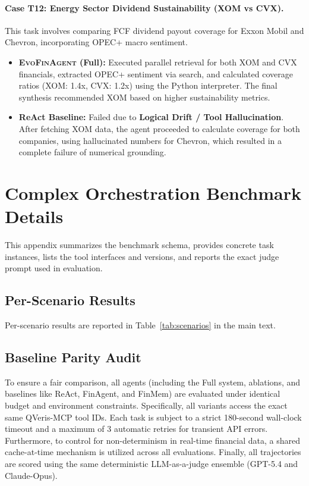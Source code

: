 \documentclass{article}
\begin{document}
\paragraph{Case T12: Energy Sector Dividend Sustainability (XOM vs CVX).}
This task involves comparing FCF dividend payout coverage for Exxon Mobil and Chevron, incorporating OPEC+ macro sentiment.
\begin{itemize}
    \item \textbf{\textsc{EvoFinAgent} (Full):} Executed parallel retrieval for both XOM and CVX financials, extracted OPEC+ sentiment via search, and calculated coverage ratios (XOM: 1.4x, CVX: 1.2x) using the Python interpreter. The final synthesis recommended XOM based on higher sustainability metrics.
    \item \textbf{ReAct Baseline:} Failed due to \textbf{Logical Drift / Tool Hallucination}. After fetching XOM data, the agent proceeded to calculate coverage for both companies, using hallucinated numbers for Chevron, which resulted in a complete failure of numerical grounding.
\end{itemize}

\section{Complex Orchestration Benchmark Details}
This appendix summarizes the benchmark schema, provides concrete task instances, lists the tool interfaces and versions, and reports the exact judge prompt used in evaluation.

\subsection{Per-Scenario Results}

Per-scenario results are reported in Table~\ref{tab:scenarios} in the main text.

\subsection{Baseline Parity Audit}
To ensure a fair comparison, all agents (including the Full system, ablations, and baselines like ReAct, FinAgent, and FinMem) are evaluated under identical budget and environment constraints. Specifically, all variants access the exact same QVeris-MCP tool IDs. Each task is subject to a strict 180-second wall-clock timeout and a maximum of 3 automatic retries for transient API errors. Furthermore, to control for non-determinism in real-time financial data, a shared cache-at-time mechanism is utilized across all evaluations. Finally, all trajectories are scored using the same deterministic LLM-as-a-judge ensemble (GPT-5.4 and Claude-Opus).
\end{document}
